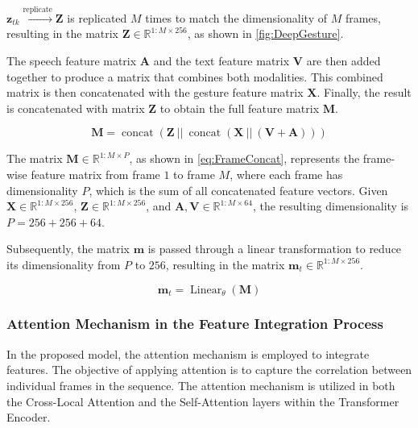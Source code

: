 $\mathbf{z}_{tk} \xrightarrow{\operatorname{replicate}} \mathbf{Z}$ is replicated $M$ times to match the dimensionality of $M$ frames, resulting in the matrix $\mathbf{Z} \in \mathbb{R}^{1:M \times 256}$, as shown in \autoref{fig:DeepGesture}.

The speech feature matrix $\mathbf{A}$ and the text feature matrix $\mathbf{V}$ are then added together to produce a matrix that combines both modalities. This combined matrix is then concatenated with the gesture feature matrix $\mathbf{X}$. Finally, the result is concatenated with matrix $\mathbf{Z}$ to obtain the full feature matrix $\mathbf{M}$.


\begin{equation}
	\label{eq:FrameConcat}
	\mathbf{M} = \operatorname{concat}( \mathbf{Z}\  || \   \operatorname{concat}(\mathbf{X}\ || \  (\mathbf{V} + \mathbf{A}) ) )
\end{equation}

The matrix $\mathbf{M} \in \mathbb{R}^{1:M \times P}$, as shown in \autoref{eq:FrameConcat}, represents the frame-wise feature matrix from frame $1$ to frame $M$, where each frame has dimensionality $P$, which is the sum of all concatenated feature vectors. Given $\mathbf{X} \in \mathbb{R}^{1:M \times 256}$, $\mathbf{Z} \in \mathbb{R}^{1:M \times 256}$, and $\mathbf{A}, \mathbf{V} \in \mathbb{R}^{1:M \times 64}$, the resulting dimensionality is $P = 256 + 256 + 64$.

Subsequently, the matrix $\mathbf{m}$ is passed through a linear transformation to reduce its dimensionality from $P$ to $256$, resulting in the matrix $\mathbf{m}_{t} \in \mathbb{R}^{1:M \times 256}$.

\begin{equation}
	\label{eq:FeatureDimensionReducion}
	\mathbf{m}_{t} = \operatorname{Linear}_{\theta}( \mathbf{M} )
\end{equation}

\subsubsection{Attention Mechanism in the Feature Integration Process}

In the proposed model, the attention mechanism \citep{vaswani2017attention} is employed to integrate features. The objective of applying attention is to capture the correlation between individual frames in the sequence. The attention mechanism is utilized in both the Cross-Local Attention and the Self-Attention layers within the Transformer Encoder.

